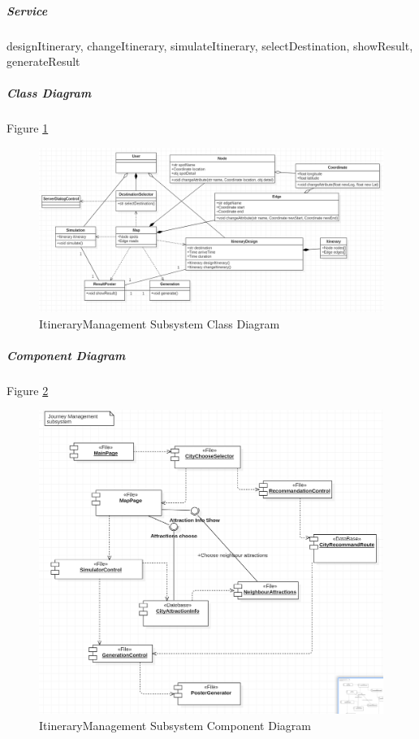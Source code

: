 \documentclass[10pt]{article}
\begin{document}
\subparagraph{Service}  designItinerary, changeItinerary, simulateItinerary, selectDestination, showResult, generateResult

\subparagraph{Class Diagram} Figure \ref{ItineraryManagement Subsystem Class Diagram}

\begin{figure}[H]
	\centering
	
	\includegraphics[width=14cm]{journeyclass.png}
	\caption{ItineraryManagement Subsystem Class Diagram}
	\label{ItineraryManagement Subsystem Class Diagram}
\end{figure}

\subparagraph{Component Diagram} Figure \ref{ItineraryManagement Subsystem Component Diagram}

\begin{figure}[H]
	\centering
	
	\includegraphics[width=14cm]{journeycom.png}
	\caption{ItineraryManagement Subsystem Component Diagram}
	\label{ItineraryManagement Subsystem Component Diagram}
\end{figure}
\end{document}
